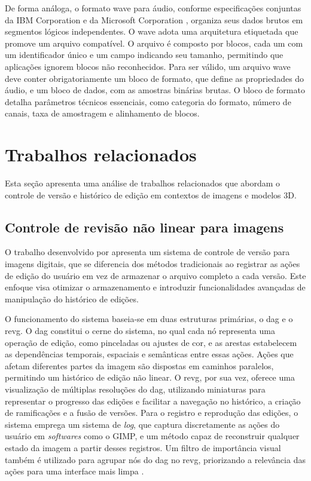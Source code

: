 De forma análoga, o formato \gls{wave} para áudio, conforme especificações
conjuntas da IBM Corporation e da Microsoft Corporation \cite{IBM1991}, organiza
seus dados brutos em segmentos lógicos independentes. O \gls{wave} adota uma
arquitetura etiquetada que promove um arquivo compatível. O arquivo é composto por
blocos, cada um com um identificador único e um campo indicando seu tamanho,
permitindo que aplicações ignorem blocos não reconhecidos. Para ser válido, um
arquivo \gls{wave} deve conter obrigatoriamente um bloco de formato, que define as
propriedades do áudio, e um bloco de dados, com as amostras binárias brutas. O
bloco de formato detalha parâmetros técnicos essenciais, como categoria do formato,
número de canais, taxa de amostragem e alinhamento de blocos.

\section{Trabalhos relacionados}

Esta seção apresenta uma análise de trabalhos relacionados que abordam o controle de versão e histórico de edição em contextos de imagens e modelos 3D.

\subsection{Controle de revisão não linear para imagens}

O trabalho desenvolvido por  apresenta um sistema de controle
de versão para imagens digitais, que se diferencia dos métodos tradicionais ao
registrar as ações de edição do usuário em vez de armazenar o arquivo completo a
cada versão. Este enfoque visa otimizar o armazenamento e introduzir funcionalidades
avançadas de manipulação do histórico de edições.

O funcionamento do sistema baseia-se em duas estruturas primárias, o \gls{dag} e o
\gls{revg}. O \gls{dag} constitui o cerne do sistema, no qual cada nó representa uma
operação de edição, como pinceladas ou ajustes de cor, e as arestas estabelecem as
dependências temporais, espaciais e semânticas entre essas ações. Ações que afetam
diferentes partes da imagem são dispostas em caminhos paralelos, permitindo um
histórico de edição não linear. O \gls{revg}, por sua vez, oferece uma visualização
de múltiplas resoluções do \gls{dag}, utilizando miniaturas para representar o
progresso das edições e facilitar a navegação no histórico, a criação de
ramificações e a fusão de versões. Para o registro e reprodução das edições, o
sistema emprega um sistema de \textit{log}, que captura discretamente as ações do
usuário em \textit{softwares} como o GIMP, e um método capaz de reconstruir qualquer
estado da imagem a partir desses registros. Um filtro de importância visual também é
utilizado para agrupar nós do \gls{dag} no \gls{revg}, priorizando a relevância das
ações para uma interface mais limpa \cite{Chen2011}.

